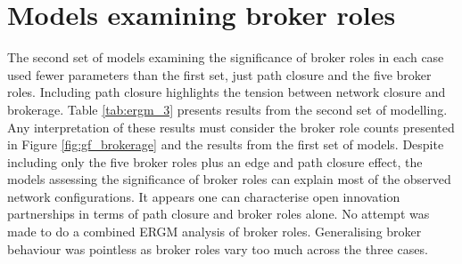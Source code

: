 \section{Models examining broker roles}

The second set of models examining the significance of broker roles in each case used fewer parameters than the first set, just path closure and the five broker roles. Including path closure highlights the tension between network closure and brokerage. Table \ref{tab:ergm_3} presents results from the second set of modelling. Any interpretation of these results must consider the broker role counts presented in Figure \ref{fig:gf_brokerage} and the results from the first set of models. Despite including only the five broker roles plus an edge and path closure effect, the models assessing the significance of broker roles can explain most of the observed network configurations. It appears one can characterise open innovation partnerships in terms of path closure and broker roles alone. No attempt was made to do a combined ERGM analysis of broker roles. Generalising broker behaviour was pointless as broker roles vary too much across the three cases. \medskip 

